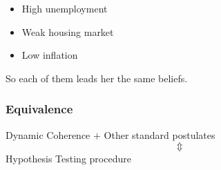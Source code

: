 \documentclass[12pt,letterpaper]{article}
\theoremstyle{definition}   %
\begin{document}
\begin{itemize}
    \item High unemployment
    \item Weak housing market
    \item Low inflation
\end{itemize}

So each of them leads her the same beliefs.


\subsubsection*{Equivalence}

\begin{center}
    Dynamic Coherence $+$ Other standard postulates 
    \[\Updownarrow\]
    Hypothesis Testing procedure
\end{center}


\section{}

         



\end{document}
